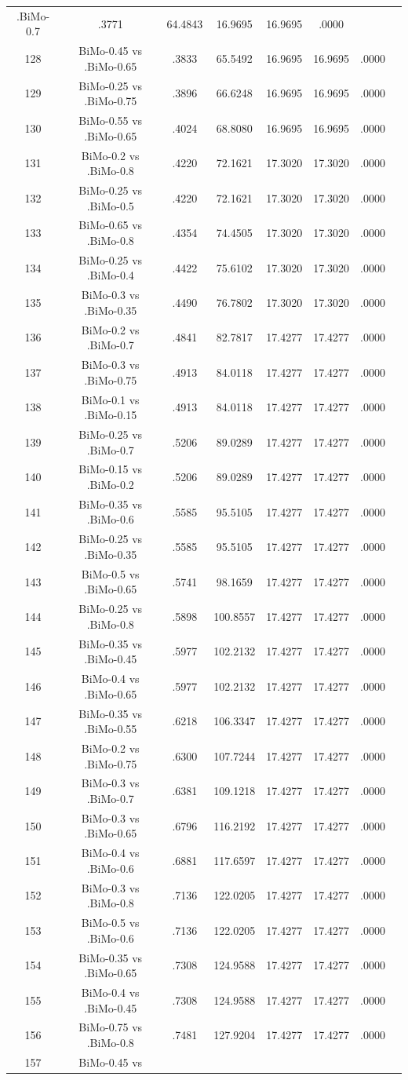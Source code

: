 \documentclass[a4paper,10pt]{article}
\begin{document}
\begin{landscape}
\begin{table}[!htp]
\begin{tabular}{cccccccc}
.BiMo-0.7&.3771&64.4843&16.9695&16.9695&.0000\\128&BiMo-0.45 vs .BiMo-0.65&.3833&65.5492&16.9695&16.9695&.0000\\129&BiMo-0.25 vs .BiMo-0.75&.3896&66.6248&16.9695&16.9695&.0000\\130&BiMo-0.55 vs .BiMo-0.65&.4024&68.8080&16.9695&16.9695&.0000\\131&BiMo-0.2 vs .BiMo-0.8&.4220&72.1621&17.3020&17.3020&.0000\\132&BiMo-0.25 vs .BiMo-0.5&.4220&72.1621&17.3020&17.3020&.0000\\133&BiMo-0.65 vs .BiMo-0.8&.4354&74.4505&17.3020&17.3020&.0000\\134&BiMo-0.25 vs .BiMo-0.4&.4422&75.6102&17.3020&17.3020&.0000\\135&BiMo-0.3 vs .BiMo-0.35&.4490&76.7802&17.3020&17.3020&.0000\\136&BiMo-0.2 vs .BiMo-0.7&.4841&82.7817&17.4277&17.4277&.0000\\137&BiMo-0.3 vs .BiMo-0.75&.4913&84.0118&17.4277&17.4277&.0000\\138&BiMo-0.1 vs .BiMo-0.15&.4913&84.0118&17.4277&17.4277&.0000\\139&BiMo-0.25 vs .BiMo-0.7&.5206&89.0289&17.4277&17.4277&.0000\\140&BiMo-0.15 vs .BiMo-0.2&.5206&89.0289&17.4277&17.4277&.0000\\141&BiMo-0.35 vs .BiMo-0.6&.5585&95.5105&17.4277&17.4277&.0000\\142&BiMo-0.25 vs .BiMo-0.35&.5585&95.5105&17.4277&17.4277&.0000\\143&BiMo-0.5 vs .BiMo-0.65&.5741&98.1659&17.4277&17.4277&.0000\\144&BiMo-0.25 vs .BiMo-0.8&.5898&100.8557&17.4277&17.4277&.0000\\145&BiMo-0.35 vs .BiMo-0.45&.5977&102.2132&17.4277&17.4277&.0000\\146&BiMo-0.4 vs .BiMo-0.65&.5977&102.2132&17.4277&17.4277&.0000\\147&BiMo-0.35 vs .BiMo-0.55&.6218&106.3347&17.4277&17.4277&.0000\\148&BiMo-0.2 vs .BiMo-0.75&.6300&107.7244&17.4277&17.4277&.0000\\149&BiMo-0.3 vs .BiMo-0.7&.6381&109.1218&17.4277&17.4277&.0000\\150&BiMo-0.3 vs .BiMo-0.65&.6796&116.2192&17.4277&17.4277&.0000\\151&BiMo-0.4 vs .BiMo-0.6&.6881&117.6597&17.4277&17.4277&.0000\\152&BiMo-0.3 vs .BiMo-0.8&.7136&122.0205&17.4277&17.4277&.0000\\153&BiMo-0.5 vs .BiMo-0.6&.7136&122.0205&17.4277&17.4277&.0000\\154&BiMo-0.35 vs .BiMo-0.65&.7308&124.9588&17.4277&17.4277&.0000\\155&BiMo-0.4 vs .BiMo-0.45&.7308&124.9588&17.4277&17.4277&.0000\\156&BiMo-0.75 vs .BiMo-0.8&.7481&127.9204&17.4277&17.4277&.0000\\157&BiMo-0.45 vs 
\end{tabular}
\end{table}
\end{landscape}
\end{document}
